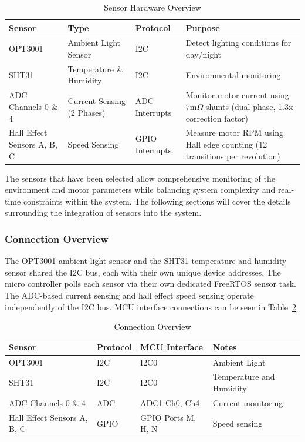 \documentclass[a4paper, 11pt, titlepage]{article}
\begin{document}
\begin{table}[H]
    \centering
    \caption{Sensor Hardware Overview}
    \label{tab:sensor-overview}
    \begin{tabularx}{\textwidth}{|l|l|l|X|}
    \hline
    \textbf{Sensor} & \textbf{Type} & \textbf{Protocol} & \textbf{Purpose} \\ \hline
    OPT3001 & Ambient Light Sensor & I2C & Detect lighting conditions for day/night \\ \hline
    SHT31 & Temperature \& Humidity & I2C & Environmental monitoring \\ \hline
    ADC Channels 0 \& 4 & Current Sensing (2 Phases) & ADC Interrupts & Monitor motor current using 7m$\Omega$ shunts (dual phase, 1.3x correction factor) \\ \hline
    Hall Effect Sensors A, B, C & Speed Sensing & GPIO Interrupts & Measure motor RPM using Hall edge counting (12 transitions per revolution) \\ \hline
    \end{tabularx}
\end{table}
The sensors that have been selected allow comprehensive monitoring of the environment and motor parameters while balancing system complexity and real-time constraints within the system. The following sections will cover the details surrounding the integration of sensors into the system.\\
\subsubsection{Connection Overview}
The OPT3001 ambient light sensor and the SHT31 temperature and humidity sensor \parencite{sht31} shared the I2C bus, each with their own unique device addresses. The micro controller polls each sensor via their own dedicated FreeRTOS sensor task. The ADC-based current sensing and hall effect speed sensing operate independently of the I2C bus. MCU interface connections can be seen in Table~\ref{tab:connection-overview}\\

\begin{table}[H]
    \centering
    \caption{Connection Overview}
    \label{tab:connection-overview}
    \begin{tabularx}{\textwidth}{|l|l|l|X|}
    \hline
    \textbf{Sensor} & \textbf{Protocol} & \textbf{MCU Interface} & \textbf{Notes} \\ \hline
    OPT3001 & I2C & I2C0 & Ambient Light \\ \hline
    SHT31 & I2C & I2C0 & Temperature and Humidity \\ \hline
    ADC Channels 0 \& 4 & ADC & ADC1 Ch0, Ch4 & Current monitoring \\ \hline
    Hall Effect Sensors A, B, C & GPIO & GPIO Ports M, H, N & Speed sensing \\ \hline
    \end{tabularx}
\end{table}
\end{document}
